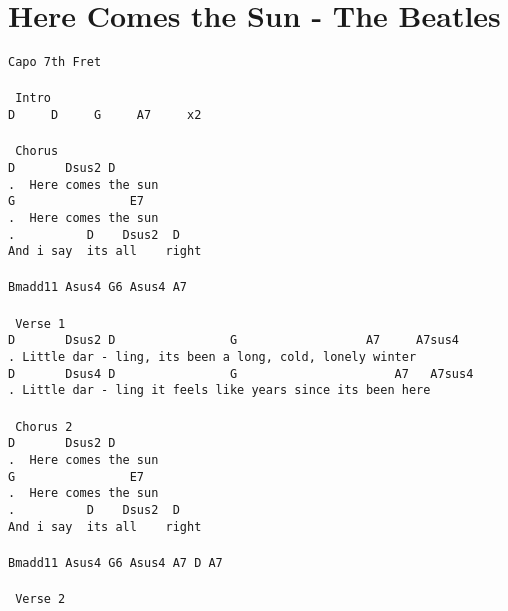 \newpage
\section{Here Comes the Sun - The Beatles}
\label{Here Comes the Sun - The Beatles}
\texttt{Capo\ 7th\ Fret\\
\\
\lbrack\ Intro\rbrack\\
D\ \ \ \ \ D\ \ \ \ \ G\ \ \ \ \ A7\ \ \ \ \ x2\\
\\
\lbrack\ Chorus\rbrack\\
D\ \ \ \ \ \ \ Dsus2\ D\\
. \ Here\ comes\ the\ sun\\
G\ \ \ \ \ \ \ \ \ \ \ \ \ \ \ \ E7\\
. \ Here\ comes\ the\ sun\\
. \ \ \ \ \ \ \ \ \ D\ \ \ \ Dsus2\ \ D\\
And\ i\ say\ \ its\ all\ \ \ \ right\\
\\
Bmadd11\ Asus4\ G6\ Asus4\ A7\\
\\
\lbrack\ Verse\ 1\rbrack\\
D\ \ \ \ \ \ \ Dsus2\ D\ \ \ \ \ \ \ \ \ \ \ \ \ \ \ \ G\ \ \ \ \ \ \ \ \ \ \ \ \ \ \ \ \ \ A7\ \ \ \ \ A7sus4\\
. Little\ dar\ -\ ling,\ its\ been\ a\ long,\ cold,\ lonely\ winter\\
D\ \ \ \ \ \ \ Dsus4\ D\ \ \ \ \ \ \ \ \ \ \ \ \ \ \ \ G\ \ \ \ \ \ \ \ \ \ \ \ \ \ \ \ \ \ \ \ \ \ A7\ \ \ A7sus4\\
. Little\ dar\ -\ ling\ it\ feels\ like\ years\ since\ its\ been\ here\\
\\
\lbrack\ Chorus\ 2\rbrack\\
D\ \ \ \ \ \ \ Dsus2\ D\\
. \ Here\ comes\ the\ sun\\
G\ \ \ \ \ \ \ \ \ \ \ \ \ \ \ \ E7\\
. \ Here\ comes\ the\ sun\\
. \ \ \ \ \ \ \ \ \ D\ \ \ \ Dsus2\ \ D\\
And\ i\ say\ \ its\ all\ \ \ \ right\\
\\
Bmadd11\ Asus4\ G6\ Asus4\ A7\ D\ A7\\
\\
\lbrack\ Verse\ 2\rbrack\\
}

